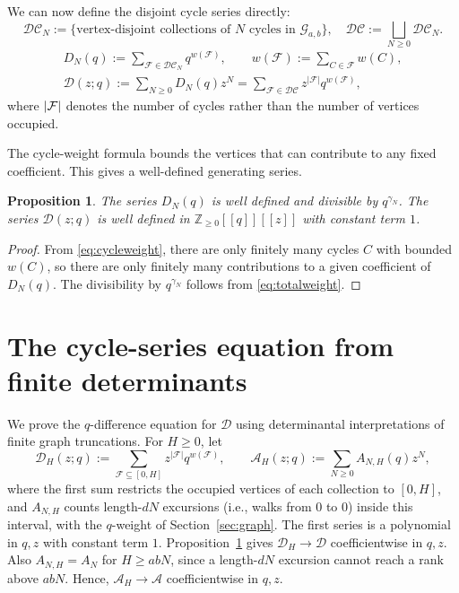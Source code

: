 \documentclass[12pt,reqno]{amsart}
\numberwithin{equation}{section}
\newtheorem{proposition}[theorem]{Proposition}
\theoremstyle{definition}
\theoremstyle{remark}
\theoremstyle{plain}
\newcommand{\NN}{\mathbb Z_{\ge0}}
\DeclarePairedDelimiter\abs{\lvert}{\rvert}
\newcommand{\Aseries}{\mathscr A}
\newcommand{\Dseries}{\mathscr D}
\newcommand{\Ggraph}{\mathcal G_{a,b}}
\begin{document}
We can now define the disjoint cycle series directly:
\[ \mathcal{DC}_N:=\{\text{vertex-disjoint collections of $N$ cycles in $\Ggraph$}\}, \quad \mathcal{DC}:=\bigsqcup_{N\ge 0} \mathcal{DC}_N.\]
\begin{equation}\label{eq:cycleseries}
\begin{gathered}
D_N(q):=\sum_{\mathcal F\in \mathcal{DC}_N} q^{w(\mathcal F)}, \qquad  w(\mathcal F):=\sum_{C\in\mathcal F}w(C),\\
 \Dseries(z;q):=\sum_{N\ge 0} D_N(q)z^N=\sum_{\mathcal F\in \mathcal{DC}}z^{|\mathcal F|}q^{w(\mathcal F)},
 \end{gathered}
\end{equation}
where $\abs{\mathcal F}$ denotes the number of cycles rather than the number of vertices occupied.


The cycle-weight formula bounds the vertices that can contribute to any fixed coefficient.  This gives a well-defined generating series.

\begin{proposition}\label{prop:detlimit}
The series $D_N(q)$ is well defined and divisible by $q^{\gamma_N}$. The series $\Dseries(z;q)$ is well defined in $\NN[[q]][[z]]$ with constant term $1$.
\end{proposition}
\begin{proof}
From \eqref{eq:cycleweight}, there are only finitely many cycles $C$ with bounded $w(C)$, so there are only finitely many contributions to a given coefficient of $D_N(q)$. The divisibility by $q^{\gamma_N}$ follows from \eqref{eq:totalweight}.
\end{proof}

\section{The cycle-series equation from finite determinants}\label{sec:determinant}
We prove the $q$-difference equation for $\Dseries$ using determinantal interpretations
of finite graph truncations.  
For $H\ge0$, let
\begin{equation}\label{eq:detcycles}
 \Dseries_H(z;q):=\sum_{\mathcal F\subseteq[0,H]}
                z^{|\mathcal F|}q^{w(\mathcal F)},
 \qquad
 \Aseries_H(z;q):=\sum_{N\ge0}A_{N,H}(q)z^N,
\end{equation}
where the first sum restricts the occupied vertices of each collection
to $[0,H]$, and $A_{N,H}$ counts length-$dN$ excursions (i.e., walks from $0$ to $0$)
inside this interval, with the $q$-weight of Section~\ref{sec:graph}.
The first series is a polynomial in $q,z$ with constant term $1$.
Proposition~\ref{prop:detlimit} gives
$\Dseries_H\to\Dseries$ coefficientwise in $q,z$.
Also $A_{N,H}=A_N$ for $H\ge abN$, since a length-$dN$ excursion
cannot reach a rank above $abN$. Hence, $\Aseries_H\to \Aseries$ coefficientwise in $q,z$.
\end{document}
